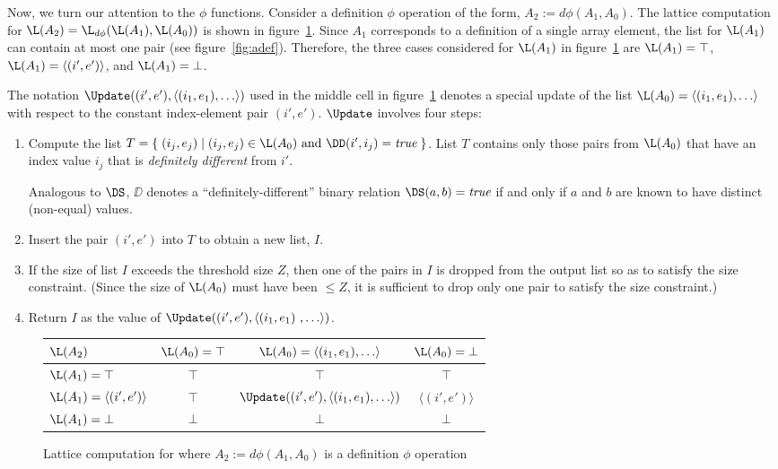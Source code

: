 Now, we turn our attention to the $\phi$ functions. 
Consider a
definition $\phi$ operation
of the form, $A_2 := d\phi(A_1, A_0)$.  
The lattice computation for $\L(A_2) = \L_{d\phi}(\L(A_1), \L(A_0))$
is shown in figure~\ref{fig:dphi}.  Since $A_1$ corresponds to a definition
of a single array element, the list for $\L(A_1)$ can contain
at most one pair (see figure~\ref{fig:adef}).
Therefore, the three cases considered for $\L(A_1)$ in figure~\ref{fig:dphi}
are $\L(A_1) = \top$, $\L(A_1) = \langle(i',e')\rangle$, and
 $\L(A_1) = \bot$.

The notation 
$\Update((i',e'),\langle (i_1,e_1), \ldots \rangle)$
used in the middle cell in 
figure~\ref{fig:dphi} denotes a special update of 
the list $\L(A_0) = \langle (i_1,e_1), \ldots \rangle$
with respect to the constant
index-element pair $(i',e')$. $\Update$ involves four steps\label{def:update}:
\begin{enumerate}
\item Compute the list $T = \{\;(i_j,e_j)\;|\;(i_j,e_j)\in\L(A_0)
\mbox{~and~}\DD(i',i_j)=\mbox{\it true}\;\}$.  List $T$
contains only those pairs from $\L(A_0)$ that have an index
value $i_j$ that is {\it definitely different} from $i'$.

Analogous to $\DS$, $\DD$ denotes a ``definitely-different'' binary
relation \ie $\DS(a,b) = \mbox{\it true}$ if and only if $a$ and
$b$ are known to have distinct (non-equal) values.

\item Insert the pair $(i',e')$ into $T$ to obtain a new list, $I$.
\item If the 
size of list
$I$ exceeds the threshold size $Z$, then one of the pairs in $I$ is
dropped from the output list so as to satisfy the size constraint.  
(Since the size of $\L(A_0)$ must have been $\leq Z$, it is sufficient
to drop only one pair to satisfy the size constraint.)
\item Return $I$ as the value of 
$\Update((i',e'),\langle (i_1,e_1)\
, \ldots \rangle)$.
\end{enumerate}

\begin{figure}%
\begin{center}
\begin{tabular}{|l||c|c|c|}
\hline
$\L(A_2)$ & $\L(A_0) = \top$ & $\L(A_0) = \langle (i_1,e_1), \ldots \rangle $ & $\L(A_0) = \bot$ \\
\hline \hline
$\L(A_1) = \top$ & $\top$ & $\top$ & $\top$ \\
\hline
$\L(A_1) = \langle(i',e')\rangle$ & $\top$ & $\Update((i',e'),\langle (i_1,e_1), \ldots \rangle)$ & $\langle(i',e')\rangle$ \\
\hline
$\L(A_1) = \bot$ & $\bot$ & $\bot$ & $\bot$ \\
\hline
\end{tabular}
\end{center}
\caption{Lattice computation for 
where $A_2 := d\phi(A_1, A_0)$ is
a definition $\phi$ operation}
\label{fig:dphi}
\end{figure}


